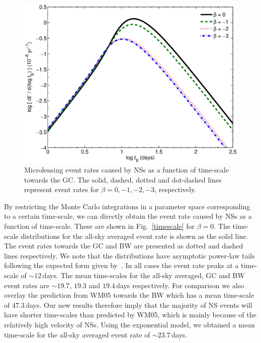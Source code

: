 \documentclass[iop,apj]{emulateapj}
\begin{document}
%
\begin{figure}
\begin{center}
  \includegraphics[width=3.5 in]{time_beta.eps}
%
\caption{Microlensing event rates caused by NSs as a function of time-scale towards
the GC. The solid, dashed, dotted and dot-dashed lines represent event rates for
$\beta=0,-1,-2,-3$, respectively.
}
\label{timescale_beta}
\end{center}
\end{figure}
%
%
By restricting the Monte Carlo integrations in a parameter space corresponding to a certain time-scale, 
we can directly obtain the event rate caused by NSs as a function of time-scale. These are 
shown in Fig.~\ref{timescale} for $\beta = 0$. The time-scale distributions for the all-sky 
averaged event rate is shown as the solid line. The event rates towards the GC and BW 
are presented as dotted and dashed lines respectively. We note that the distributions 
have asymptotic power-law tails following the expected form given by~\citet{mao}. In all 
cases the event rate peaks at a time-scale of $\sim 12$\,days. The mean time-scales 
for the all-sky averaged, GC and BW event rates are $\sim 19.7$, $19.3$ and $19.4$\,days 
respectively. For comparison we also overlay the prediction from WM05 towards the BW which 
has a mean time-scale of $47.3$\,days. Our new results therefore imply that the majority 
of NS events will have shorter time-scales than predicted by WM05, which is mainly 
because of the relatively high velocity of NSs.
%
Using the exponential	model, we obtained a mean time-scale for the all-sky averaged event rate 
of $\sim 23.7$\,days.
\end{document}
